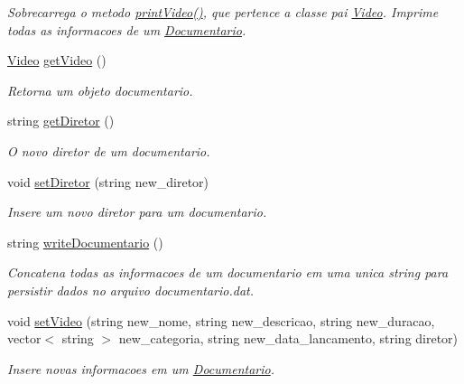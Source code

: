 \begin{DoxyCompactItemize}
\begin{DoxyCompactList}\small\item\em Sobrecarrega o metodo \hyperlink{classDocumentario_abe00fa763c2761ed79f80fb7b2a99de0}{print\+Video()}, que pertence a classe pai \hyperlink{classVideo}{Video}. Imprime todas as informacoes de um \hyperlink{classDocumentario}{Documentario}. \end{DoxyCompactList}\item 
\hyperlink{classVideo}{Video} \hyperlink{classDocumentario_a2e5db493cca5e2e6803368d63215a978}{get\+Video} ()
\begin{DoxyCompactList}\small\item\em Retorna um objeto documentario. \end{DoxyCompactList}\item 
string \hyperlink{classDocumentario_acad522309e6e8c8a56324897ffdab5f4}{get\+Diretor} ()
\begin{DoxyCompactList}\small\item\em O novo diretor de um documentario. \end{DoxyCompactList}\item 
void \hyperlink{classDocumentario_a0998f80222836821c7de4cc4df2153f8}{set\+Diretor} (string new\+\_\+diretor)
\begin{DoxyCompactList}\small\item\em Insere um novo diretor para um documentario. \end{DoxyCompactList}\item 
string \hyperlink{classDocumentario_a02bb364042381520cc90b03da9f73ffd}{write\+Documentario} ()
\begin{DoxyCompactList}\small\item\em Concatena todas as informacoes de um documentario em uma unica string para persistir dados no arquivo documentario.\+dat. \end{DoxyCompactList}\item 
void \hyperlink{classDocumentario_abb7ad2e1d60b0dea2f39285d73a883f2}{set\+Video} (string new\+\_\+nome, string new\+\_\+descricao, string new\+\_\+duracao, vector$<$ string $>$ new\+\_\+categoria, string new\+\_\+data\+\_\+lancamento, string diretor)\hypertarget{classDocumentario_abb7ad2e1d60b0dea2f39285d73a883f2}{}\label{classDocumentario_abb7ad2e1d60b0dea2f39285d73a883f2}

\begin{DoxyCompactList}\small\item\em Insere novas informacoes em um \hyperlink{classDocumentario}{Documentario}. \end{DoxyCompactList}\end{DoxyCompactItemize}
